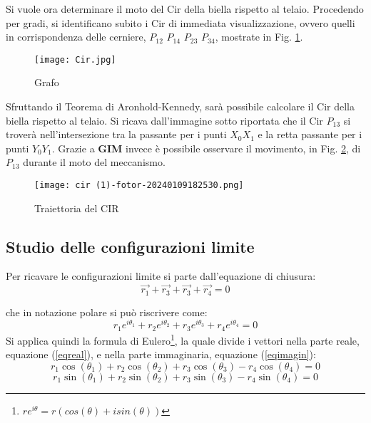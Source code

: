 \documentclass{article}
\begin{document}
Si vuole ora determinare il moto del Cir della biella rispetto al telaio. Procedendo per gradi, si identificano subito i Cir di immediata visualizzazione, ovvero quelli in corrispondenza delle cerniere, $P_{12} $ $P_{14}$ $P_{23}$ $P_{34}$, mostrate in Fig. \ref{grafo}.
\begin{figure} [h!]
    \centering
    \texttt{[image: Cir.jpg]}
    \caption{Grafo}
    \label{grafo}
\end{figure}
\newpage
Sfruttando il Teorema di Aronhold-Kennedy, sarà possibile calcolare il Cir della biella rispetto al telaio.
Si ricava dall'immagine sotto riportata che il Cir $P_{13}$ si troverà nell'intersezione tra la passante per i punti $X_0X_1$ e la retta passante per i punti $Y_0Y_1$.
Grazie a \textbf{GIM} invece è possibile osservare il movimento, in Fig. \ref{traiettoria}, di $P_{13} $ durante il moto del meccanismo.
\begin{figure} [h!]
    \centering
    \texttt{[image: cir (1)-fotor-20240109182530.png]}
    \caption{Traiettoria del CIR}
    \label{traiettoria}
\end{figure}

\subsection{Studio delle configurazioni limite}
Per ricavare le configurazioni limite si parte dall'equazione di chiusura:
\begin{equation}
    \vec{r_1} +  \vec{r_3} + \vec{r_3} + \vec{r_4} = 0
\end{equation}

che in notazione polare si può riscrivere come:
\begin{equation}
    r_1e^{i\theta_1}+r_2e^{i\theta_2}+r_3e^{i\theta_3}+r_4e^{i\theta_4}=0
\end{equation}
Si applica quindi la formula di Eulero\footnote{$re^{i\theta}=r(cos(\theta)+isin(\theta))$}, la quale divide i vettori nella parte reale, equazione (\ref{eqreal}), e nella parte immaginaria, equazione (\ref{eqimagin}):
\begin{equation}
    r_1\cos(\theta_{1}) +   r_2\cos(\theta_{2}) + r_3\cos(\theta_{3}) -  r_4\cos(\theta_{4}) = 0
    \label{eqreal}
\end{equation}
\begin{equation}
r_1\sin(\theta_{1}) +  r_2\sin(\theta_{2}) + r_3\sin(\theta_{3}) -  r_4\sin(\theta_{4}) = 0
\label{eqimagin}
\end{equation}
\end{document}
